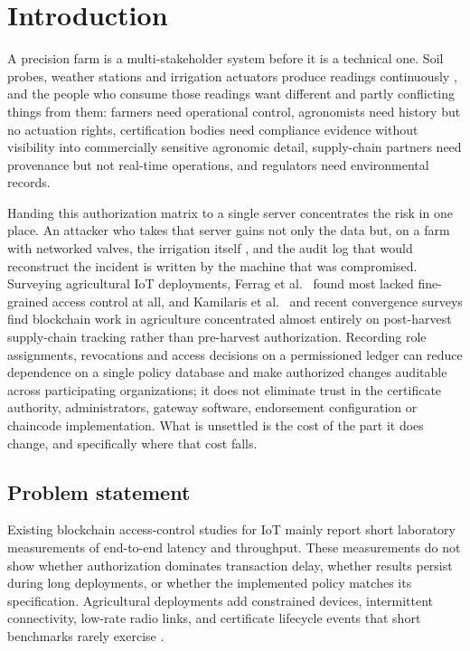 \documentclass[a4paper,fleqn]{cas-sc}
\begin{document}
\section{Introduction}
\label{sec:intro}

A precision farm is a multi-stakeholder system before it is a technical one.
Soil probes, weather stations and irrigation actuators produce readings
continuously \cite{zhang2002precision}, and the people who consume those
readings want different and partly conflicting things from them: farmers
need operational control, agronomists need history but no actuation rights,
certification bodies need compliance evidence without visibility into
commercially sensitive agronomic detail, supply-chain partners need
provenance but not real-time operations, and regulators need environmental
records.

Handing this authorization matrix to a single server concentrates the risk
in one place. An attacker who takes that server gains not only the data but,
on a farm with networked valves, the irrigation itself
\cite{benedict2021decentralized}, and the audit log that would reconstruct
the incident is written by the machine that was compromised. Surveying
agricultural IoT deployments, Ferrag et al.\ \cite{ferrag2020security} found
most lacked fine-grained access control at all, and Kamilaris et
al.\ \cite{kamilaris2019rise} and recent convergence surveys
\cite{rustemi2025synergizing} find blockchain work in agriculture
concentrated almost entirely on post-harvest supply-chain tracking rather
than pre-harvest authorization. Recording role assignments, revocations
and access decisions on a permissioned ledger can reduce dependence on a
single policy database and make authorized changes auditable across
participating organizations; it does not eliminate trust in the
certificate authority, administrators, gateway software, endorsement
configuration or chaincode implementation. What is unsettled is the
cost of the part it does change, and specifically where that cost falls.

\subsection{Problem statement}
\label{subsec:problem}

Existing blockchain access-control studies for IoT mainly report short
laboratory measurements of end-to-end latency and throughput. These
measurements do not show whether authorization dominates transaction delay,
whether results persist during long deployments, or whether the implemented
policy matches its specification. Agricultural deployments add constrained
devices, intermittent connectivity, low-rate radio links, and certificate
lifecycle events that short benchmarks rarely exercise
\cite{abang2024latency,ferrag2020security,rustemi2025synergizing}.
\end{document}
